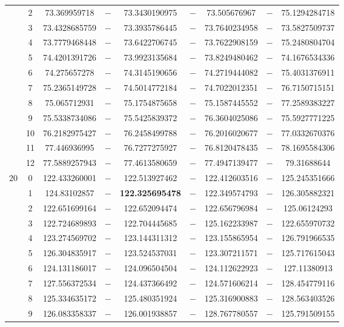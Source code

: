 \begin{table}[ht]
{\begin{tabular}{c|c|c|c|c|c|c|c|c}
& 2 & 73.369959718& $-$& 73.3430190975& $-$& 73.505676967& $-$& 75.1294284718\\ 
& 3 & 73.4328685759& $-$& 73.3935786445& $-$& 73.7640234958& $-$& 73.5827509737\\ 
& 4 & 73.7779468448& $-$& 73.6422706745& $-$& 73.7622908159& $-$& 75.2480804704\\ 
& 5 & 74.4201391726& $-$& 73.9923135684& $-$& 73.8249480462& $-$& 74.1676534336\\ 
& 6 & 74.275657278& $-$& 74.3145190656& $-$& 74.2719444082& $-$& 75.4031376911\\ 
& 7 & 75.2365149728& $-$& 74.5014772184& $-$& 74.7022012351& $-$& 76.7150715151\\ 
& 8 & 75.065712931& $-$& 75.1754875658& $-$& 75.1587445552& $-$& 77.2589383227\\ 
& 9 & 75.5338734086& $-$& 75.5425839372& $-$& 76.3604025086& $-$& 75.5927771225\\ 
& 10 & 76.2182975427& $-$& 76.2458499788& $-$& 76.2016020677& $-$& 77.0332670376\\ 
& 11 & 77.446936995& $-$& 76.7277275927& $-$& 76.8120478435& $-$& 78.1695584306\\ 
& 12 & 77.5889257943& $-$& 77.4613580659& $-$& 77.4947139477& $-$& 79.31688644\\ 
\hline                    %
\multirow{13}{*}{20} & 0 & 122.433260001& $-$& 122.513927462& $-$& 122.412603516& $-$& 125.245351666\\ 
& 1 & 124.83102857& $-$& \textbf{122.325695478}& $-$& 122.349574793& $-$& 126.305882321\\ 
& 2 & 122.651699164& $-$& 122.652094474& $-$& 122.656796984& $-$& 125.06124293\\ 
& 3 & 122.724689893& $-$& 122.704445685& $-$& 125.162233987& $-$& 122.655970732\\ 
& 4 & 123.274569702& $-$& 123.144311312& $-$& 123.155865954& $-$& 126.791966535\\ 
& 5 & 126.304835917& $-$& 123.524537031& $-$& 123.307211571& $-$& 125.717615043\\ 
& 6 & 124.131186017& $-$& 124.096504504& $-$& 124.112622923& $-$& 127.11380913\\ 
& 7 & 127.556372534& $-$& 124.437366492& $-$& 124.571606214& $-$& 128.454779116\\ 
& 8 & 125.334635172& $-$& 125.480351924& $-$& 125.316900883& $-$& 128.563403526\\ 
& 9 & 126.083358337& $-$& 126.001938857& $-$& 128.767780557& $-$& 125.791509155\\ 

\end{tabular}}
\end{table}
